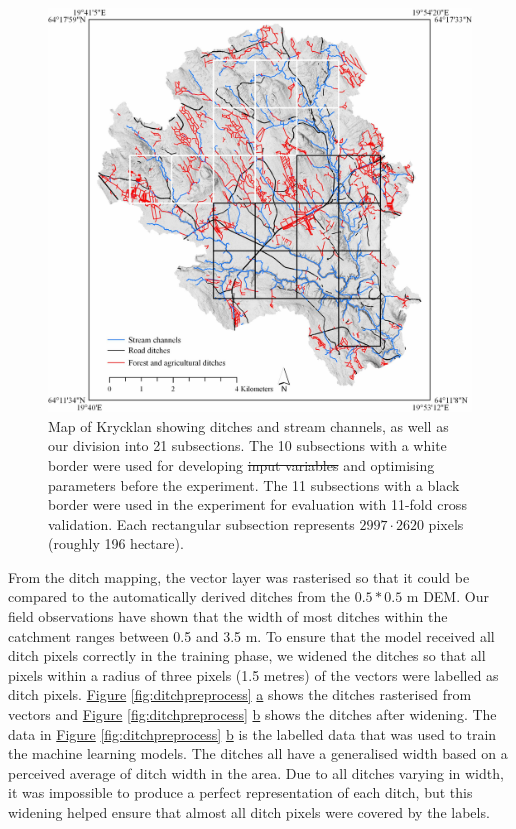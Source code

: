 \documentclass[11pt, review]{elsarticle} %
\providecommand{\DIFaddtex}[1]{{\protect\color{blue}\uwave{#1}}} %
\providecommand{\DIFdeltex}[1]{{\protect\color{red}\sout{#1}}}                      %
\providecommand{\DIFdelbegin}{} %
\providecommand{\DIFaddFL}[1]{\DIFadd{#1}} %
\providecommand{\DIFdelFL}[1]{\DIFdel{#1}} %
\providecommand{\DIFaddbeginFL}{} %
\providecommand{\DIFaddendFL}{} %
\providecommand{\DIFdelbeginFL}{} %
\providecommand{\DIFdelendFL}{} %
\providecommand{\DIFadd}[1]{\texorpdfstring{\DIFaddtex{#1}}{#1}} %
\providecommand{\DIFdel}[1]{\texorpdfstring{\DIFdeltex{#1}}{}} %
\begin{document}
\DIFdelbegin %
\DIFdelendFL \DIFaddbeginFL \begin{figure}[!htb]
    \DIFaddendFL \centering
    \includegraphics[width=1\linewidth]{./images/Krycklan_lo.jpg}
    \caption{Map of Krycklan showing ditches and stream channels, as well as our division into 21 subsections. The 10 subsections with a white border were used for developing \DIFdelbeginFL \DIFdelFL{input variables }\DIFdelendFL \DIFaddbeginFL \DIFaddFL{features }\DIFaddendFL and optimising parameters before the experiment. The 11 subsections with a black border were used in the experiment for evaluation with 11-fold cross validation. Each rectangular subsection represents $2997 \cdot 2620$ pixels (roughly 196 hectare).}
    \label{fig:swedenkrycklan}
\end{figure}

From the ditch mapping, the vector layer was rasterised so that it could be compared to the automatically derived ditches from the $0.5*0.5$ m DEM. Our field observations have shown that the  width of most ditches within the catchment ranges between 0.5 and 3.5 m. To ensure that the model received all ditch pixels correctly in the training phase, we widened the ditches so that all pixels within a radius of three pixels (1.5 metres) of the vectors were labelled as ditch pixels. \hyperref[fig:ditchpreprocess]{Figure} \ref{fig:ditchpreprocess} \hyperref[fig:ditchpreprocess]{a} shows the ditches rasterised from vectors and \hyperref[fig:ditchpreprocess]{Figure} \ref{fig:ditchpreprocess} \hyperref[fig:ditchpreprocess]{b} shows the ditches after widening. The data in \hyperref[fig:ditchpreprocess]{Figure} \ref{fig:ditchpreprocess} \hyperref[fig:ditchpreprocess]{b} is the labelled data that was used to train the machine learning models. The ditches all have a generalised width based on a perceived average of ditch width in the area. Due to all ditches varying in width, it was impossible to produce a perfect representation of each ditch, but this widening helped ensure that almost all ditch pixels were covered by the labels.
\end{document}
